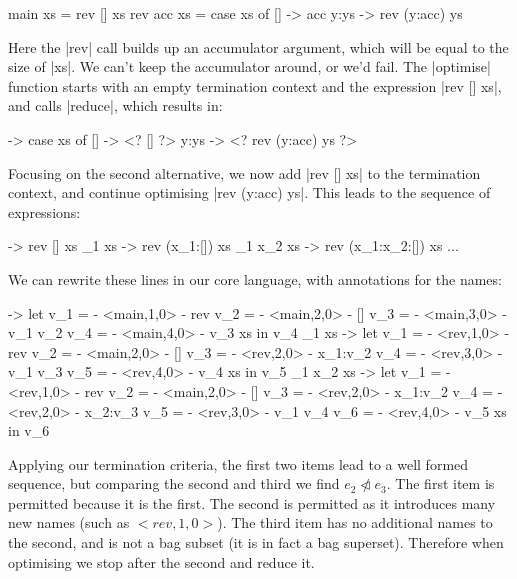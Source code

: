 \documentclass[draft]{sigplanconf}
\begin{document}
\begin{code}
main xs = rev [] xs
rev acc xs = case xs of
    []    -> acc
    y:ys  -> rev (y:acc) ys
\end{code}

Here the |rev| call builds up an accumulator argument, which will be equal to the size of |xs|. We can't keep the accumulator around, or we'd fail. The |optimise| function starts with an empty termination context and the expression |rev [] xs|, and calls |reduce|, which results in:

\begin{code}
\xs -> case xs of
    []    -> <? [] ?>
    y:ys  -> <? rev (y:acc) ys ?>
\end{code}

Focusing on the second alternative, we now add |rev [] xs| to the termination context, and continue optimising |rev (y:acc) ys|. This leads to the sequence of expressions:

\begin{code}
\xs -> rev [] xs
\x_1 xs -> rev (x_1:[]) xs
\x_1 x_2 xs -> rev (x_1:x_2:[]) xs
...
\end{code}

We can rewrite these lines in our core language, with annotations for the names:

\begin{code}
\xs ->
    let  v_1 = {- <main,1,0> -} rev
         v_2 = {- <main,2,0> -} []
         v_3 = {- <main,3,0> -} v_1 v_2
         v_4 = {- <main,4,0> -} v_3 xs
    in   v_4
\x_1 xs ->
    let  v_1 = {- <rev,1,0> -} rev
         v_2 = {- <main,2,0> -} []
         v_3 = {- <rev,2,0> -} x_1:v_2
         v_4 = {- <rev,3,0> -} v_1 v_3
         v_5 = {- <rev,4,0> -} v_4 xs
    in   v_5
\x_1 x_2 xs ->
    let  v_1 = {- <rev,1,0> -} rev
         v_2 = {- <main,2,0> -} []
         v_3 = {- <rev,2,0> -} x_1:v_2
         v_4 = {- <rev,2,0> -} x_2:v_3
         v_5 = {- <rev,3,0> -} v_1 v_4
         v_6 = {- <rev,4,0> -} v_5 xs
    in   v_6
\end{code}

Applying our termination criteria, the first two items lead to a well formed sequence, but comparing the second and third we find $e_2 \ntriangleleft e_3$. The first item is permitted because it is the first. The second is permitted as it introduces many new names (such as $<rev,1,0>$). The third item has no additional names to the second, and is not a bag subset (it is in fact a bag superset). Therefore when optimising we stop after the second and reduce it.
\end{document}
